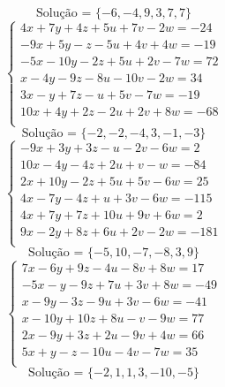 \documentclass[12pt,oneside,a4paper]{article}
\begin{document}
\begin{equation*}
\text{Solução = }\{-6,-4,9,3,7,7\}
\end{equation*}
\vspace{\baselineskip}
\begin{equation*}
\begin{cases}
4x+7y+4z+5u+7v-2w=-24 \\
-9x+5y-z-5u+4v+4w=-19 \\
-5x-10y-2z+5u+2v-7w=72 \\
x-4y-9z-8u-10v-2w=34 \\
3x-y+7z-u+5v-7w=-19 \\
10x+4y+2z-2u+2v+8w=-68 \\
\end{cases}
\end{equation*}
\begin{equation*}
\text{Solução = }\{-2,-2,-4,3,-1,-3\}
\end{equation*}
\vspace{\baselineskip}
\begin{equation*}
\begin{cases}
-9x+3y+3z-u-2v-6w=2 \\
10x-4y-4z+2u+v-w=-84 \\
2x+10y-2z+5u+5v-6w=25 \\
4x-7y-4z+u+3v-6w=-115 \\
4x+7y+7z+10u+9v+6w=2 \\
9x-2y+8z+6u+2v-2w=-181 \\
\end{cases}
\end{equation*}
\begin{equation*}
\text{Solução = }\{-5,10,-7,-8,3,9\}
\end{equation*}
\vspace{\baselineskip}
\begin{equation*}
\begin{cases}
7x-6y+9z-4u-8v+8w=17 \\
-5x-y-9z+7u+3v+8w=-49 \\
x-9y-3z-9u+3v-6w=-41 \\
x-10y+10z+8u-v-9w=77 \\
2x-9y+3z+2u-9v+4w=66 \\
5x+y-z-10u-4v-7w=35 \\
\end{cases}
\end{equation*}
\begin{equation*}
\text{Solução = }\{-2,1,1,3,-10,-5\}
\end{equation*}
\end{document}
